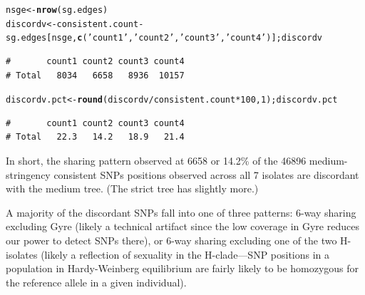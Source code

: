 \documentclass{article}\usepackage[]{graphicx}\usepackage[]{color}
\makeatletter
\newcommand{\hlnum}[1]{\textcolor[rgb]{0.686,0.059,0.569}{#1}}%
\newcommand{\hlstr}[1]{\textcolor[rgb]{0.192,0.494,0.8}{#1}}%
\newcommand{\hlopt}[1]{\textcolor[rgb]{0,0,0}{#1}}%
\newcommand{\hlstd}[1]{\textcolor[rgb]{0.345,0.345,0.345}{#1}}%
\newcommand{\hlkwb}[1]{\textcolor[rgb]{0.69,0.353,0.396}{#1}}%
\newcommand{\hlkwd}[1]{\textcolor[rgb]{0.737,0.353,0.396}{\textbf{#1}}}%
\newenvironment{kframe}{%
 \def\at@end@of@kframe{}%
 \ifinner\ifhmode%
  \def\at@end@of@kframe{\end{minipage}}%
  \begin{minipage}{\columnwidth}%
 \fi\fi%
 \def\FrameCommand##1{\hskip\@totalleftmargin \hskip-\fboxsep
 \colorbox{shadecolor}{##1}\hskip-\fboxsep
     \hskip-\linewidth \hskip-\@totalleftmargin \hskip\columnwidth}%
 \MakeFramed {\advance\hsize-\width
   \@totalleftmargin\z@ \linewidth\hsize
   \@setminipage}}%
 {\par\unskip\endMakeFramed%
 \at@end@of@kframe}
\newenvironment{knitrout}{}{} %
\makeatother
\begin{document}
\begin{knitrout}\scriptsize
{}\color{fgcolor}\begin{kframe}
\begin{alltt}
\hlstd{nsge} \hlkwb{<-} \hlkwd{nrow}\hlstd{(sg.edges)}
\hlstd{discordv} \hlkwb{<-} \hlstd{consistent.count} \hlopt{-} \hlstd{sg.edges[nsge,}\hlkwd{c}\hlstd{(}\hlstr{'count1'}\hlstd{,}\hlstr{'count2'}\hlstd{,}\hlstr{'count3'}\hlstd{,}\hlstr{'count4'}\hlstd{)] ; discordv}
\end{alltt}
\begin{verbatim}
#       count1 count2 count3 count4
# Total   8034   6658   8936  10157
\end{verbatim}
\begin{alltt}
\hlstd{discordv.pct} \hlkwb{<-} \hlkwd{round}\hlstd{(discordv}\hlopt{/}\hlstd{consistent.count}\hlopt{*}\hlnum{100}\hlstd{,}\hlnum{1}\hlstd{) ; discordv.pct}
\end{alltt}
\begin{verbatim}
#       count1 count2 count3 count4
# Total   22.3   14.2   18.9   21.4
\end{verbatim}
\end{kframe}
\end{knitrout}

In short, the sharing pattern observed at 6658 or 14.2\% of the 
46896 medium-stringency consistent SNPs positions observed across all 7 
isolates are discordant with the medium tree.  (The strict tree has slightly more.)  

A majority of the discordant SNPs fall into one of three patterns: 6-way sharing excluding Gyre 
(likely a technical artifact since the low coverage in Gyre reduces our power to detect SNPs there), 
or 6-way sharing excluding one of the two H-isolates (likely a reflection of sexuality in the 
H-clade---SNP positions in a population in Hardy-Weinberg equilibrium are fairly likely to be 
homozygous for the reference allele in a given individual).
\end{document}

